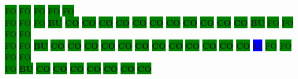 \colorbox{green}{\color[gray]{0.75}FO}%
\colorbox{green}{\color[gray]{0.75}FO}%
\colorbox{green}{\color[gray]{0.75}FO}%
\colorbox{green}{\color[gray]{0.75}FO}%
\colorbox{green}{\color[gray]{0.75}FO}%
\\
\colorbox{green}{\color[gray]{0.75}FO}%
\colorbox{green}{\color[gray]{0.75}FO}%
\colorbox{green}{\color[gray]{0.75}FO}%
\colorbox{green}{\color[rgb]{1,0,0}\textbf{BU}}%
\colorbox{green}{\color[rgb]{0,0,0}\textbf{CO}}%
\colorbox{green}{\color[rgb]{0,0,0}\textbf{CO}}%
\colorbox{green}{\color[rgb]{0,0,0}\textbf{CO}}%
\colorbox{green}{\color[rgb]{0,0,0}\textbf{CO}}%
\colorbox{green}{\color[rgb]{0,0,0}\textbf{CO}}%
\colorbox{green}{\color[rgb]{0,0,0}\textbf{CO}}%
\colorbox{green}{\color[rgb]{0,0,0}\textbf{CO}}%
\colorbox{green}{\color[rgb]{0,0,0}\textbf{CO}}%
\colorbox{green}{\color[rgb]{0,0,0}\textbf{CO}}%
\colorbox{green}{\color[rgb]{0,0,0}\textbf{CO}}%
\colorbox{green}{\color[rgb]{0,0,0}\textbf{CO}}%
\colorbox{green}{\color[rgb]{1,0,0}\textbf{BU}}%
\colorbox{green}{\color[gray]{0.75}FO}%
\colorbox{green}{\color[gray]{0.75}FO}%
\colorbox{green}{\color[gray]{0.75}FO}%
\colorbox{green}{\color[gray]{0.75}FO}%
\\
\colorbox{green}{\color[gray]{0.75}FO}%
\colorbox{green}{\color[gray]{0.75}FO}%
\colorbox{green}{\color[rgb]{1,0,0}\textbf{BU}}%
\colorbox{green}{\color[rgb]{0,0,0}\textbf{CO}}%
\colorbox{green}{\color[rgb]{0,0,0}\textbf{CO}}%
\colorbox{green}{\color[rgb]{0,0,0}\textbf{CO}}%
\colorbox{green}{\color[rgb]{0,0,0}\textbf{CO}}%
\colorbox{green}{\color[rgb]{0,0,0}\textbf{CO}}%
\colorbox{green}{\color[rgb]{0,0,0}\textbf{CO}}%
\colorbox{green}{\color[rgb]{0,0,0}\textbf{CO}}%
\colorbox{green}{\color[rgb]{0,0,0}\textbf{CO}}%
\colorbox{green}{\color[rgb]{0,0,0}\textbf{CO}}%
\colorbox{green}{\color[rgb]{0,0,0}\textbf{CO}}%
\colorbox{green}{\color[rgb]{0,0,0}\textbf{CO}}%
\colorbox{green}{\color[rgb]{0,0,0}\textbf{CO}}%
\colorbox{blue}{\color[rgb]{1,0,0}\textbf{11}}%
\colorbox{green}{\color[gray]{0.75}FO}%
\colorbox{green}{\color[gray]{0.75}FO}%
\colorbox{green}{\color[gray]{0.75}FO}%
\colorbox{green}{\color[gray]{0.75}FO}%
\\
\colorbox{green}{\color[gray]{0.75}FO}%
\colorbox{green}{\color[rgb]{1,0,0}\textbf{BU}}%
\colorbox{green}{\color[rgb]{0,0,0}\textbf{CO}}%
\colorbox{green}{\color[rgb]{0,0,0}\textbf{CO}}%
\colorbox{green}{\color[rgb]{0,0,0}\textbf{CO}}%
\colorbox{green}{\color[rgb]{0,0,0}\textbf{CO}}%
\colorbox{green}{\color[rgb]{0,0,0}\textbf{CO}}%
\colorbox{green}{\color[rgb]{0,0,0}\textbf{CO}}%
\colorbox{green}{\color[rgb]{0,0,0}\textbf{CO}}%
